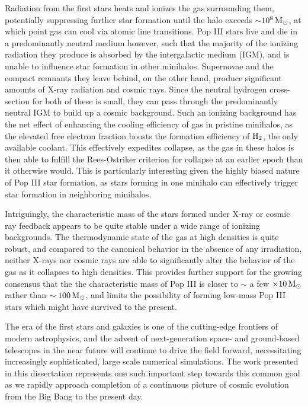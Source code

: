 \documentclass[../thesis.tex]{subfiles}
\begin{document}
Radiation from the first stars heats and ionizes the gas surrounding them, potentially suppressing further star formation until the halo exceeds $\sim$$10^8\,\mathrm{M}_{\odot}$, at which point gas can cool via atomic line transitions.  
Pop III stars live and die in a predominantly neutral medium however, such that the majority of the ionizing radiation they produce is absorbed by the intergalactic medium (IGM), and is unable to influence star formation in other minihalos.  
Supernovae and the compact remnants they leave behind, on the other hand, produce significant amounts of X-ray radiation and cosmic rays.
Since the neutral hydrogen cross-section for both of these is small, they can pass through the predominantly neutral IGM to build up a cosmic background.
Such an ionizing background has the net effect of enhancing the cooling efficiency of gas in pristine minihalos, as the elevated free electron fraction boosts the formation efficiency of $\mathrm{H}_2$, the only available coolant.
This effectively expedites collapse, as the gas in these halos is then able to fulfill the Rees-Ostriker criterion for collapse at an earlier epoch than it otherwise would.
This is particularly interesting given the highly biased nature of Pop III star formation, as stars forming in one minihalo can effectively trigger star formation in neighboring minihalos.

Intriguingly, the characteristic mass of the stars formed under X-ray or cosmic ray feedback appears to be quite stable under a wide range of ionizing backgrounds.
The thermodynamic state of the gas at high densities is quite robust, and compared to the canonical behavior in the absence of any irradiation, neither X-rays nor cosmic rays are able to significantly alter the behavior of the gas as it collapses to high densities.
This provides further support for the growing consensus that the the characteristic mass of Pop III is closer to $\sim$ a few $\times10\,\mathrm{M}_{\odot}$ rather than $\sim100\,\mathrm{M}_{\odot}$, and limits the possibility of forming low-mass Pop III stars which might have survived to the present.

The era of the first stars and galaxies is one of the cutting-edge frontiers of modern astrophysics, and the advent of next-generation space- and ground-based telescopes in the near future will continue to drive the field forward, necessitating increasingly sophisticated, large scale numerical simulations. 
The work presented in this dissertation represents one such important step towards this common goal as we rapidly approach completion of a continuous picture of cosmic evolution from the Big Bang to the present day.
\end{document}
